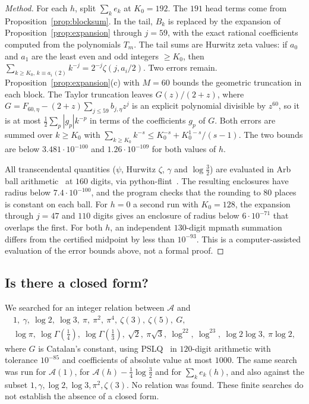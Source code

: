\documentclass[11pt]{article}
\theoremstyle{definition}
\theoremstyle{remark}
\newcommand{\Alp}{\mathcal{A}}
\begin{document}
\begin{proof}[Method]
For each $h$, split $\sum_ke_k$ at $K_0=192$. The $191$ head terms come
from Proposition~\ref{prop:blocksum}. In the tail, $B_k$ is replaced by
the expansion of Proposition~\ref{prop:expansion} through $j=59$, with
the exact rational coefficients computed from the polynomials $T_m$. The
tail sums are Hurwitz zeta values: if $a_0$ and $a_1$ are the least even
and odd integers $\ge K_0$, then
$\sum_{k\ge K_0,\,k\equiv a_i\,(2)}k^{-j}=2^{-j}\zeta(j,a_i/2)$. Two
errors remain. Proposition~\ref{prop:expansion}(c) with $M=60$ bounds
the geometric truncation in each block. The Taylor truncation leaves
$G(z)/(2+z)$, where $G=F_{60,\eta}-(2+z)\sum_{j\le59}b_{j,\eta}z^j$ is an
explicit polynomial divisible by $z^{60}$, so it is at most
$\frac12\sum_p|g_p|k^{-p}$ in terms of the coefficients $g_p$ of $G$.
Both errors are summed over $k\ge K_0$ with
$\sum_{k\ge K_0}k^{-s}\le K_0^{-s}+K_0^{1-s}/(s-1)$. The two bounds are
below $3.481\cdot10^{-100}$ and $1.26\cdot10^{-109}$ for both values of
$h$.

All transcendental quantities ($\psi$, Hurwitz $\zeta$, $\gamma$ and
$\log\frac32$) are evaluated in Arb ball arithmetic~\cite{Arb} at
$160$ digits, via python-flint~\cite{FLINT}. The resulting enclosures
have radius below $7.4\cdot10^{-100}$, and the program checks that the
rounding to $80$ places is constant on each ball. For $h=0$ a second run
with $K_0=128$, the expansion through $j=47$ and $110$ digits gives an
enclosure of radius below $6\cdot10^{-71}$ that overlaps the first. For
both $h$, an independent $130$-digit mpmath summation differs from the
certified midpoint by less than $10^{-93}$. This is a computer-assisted
evaluation of the error bounds above, not a formal proof.
\end{proof}

\subsection*{Is there a closed form?}

We searched for an integer relation between $\Alp$ and
\begin{gather*}
1,\ \gamma,\ \log2,\ \log3,\ \pi,\ \pi^2,\ \pi^4,\ \zeta(3),\ \zeta(5),\ G,\\
\log\pi,\ \log\Gamma(\tfrac14),\ \log\Gamma(\tfrac13),\ \sqrt2,\
\pi\sqrt3,\ \log^22,\ \log^23,\ \log2\log3,\ \pi\log2,
\end{gather*}
where $G$ is Catalan's constant, using PSLQ~\cite{PSLQ} in $120$-digit
arithmetic with tolerance $10^{-85}$ and coefficients of absolute value
at most $1000$. The same search was run for $\Alp(1)$, for
$\Alp(h)-\frac14\log\frac32$ and for $\sum_ke_k(h)$, and also against the
subset $1,\gamma,\log2,\log3,\pi^2,\zeta(3)$. No relation was found.
These finite searches do not establish the absence of a closed form.
\end{document}
